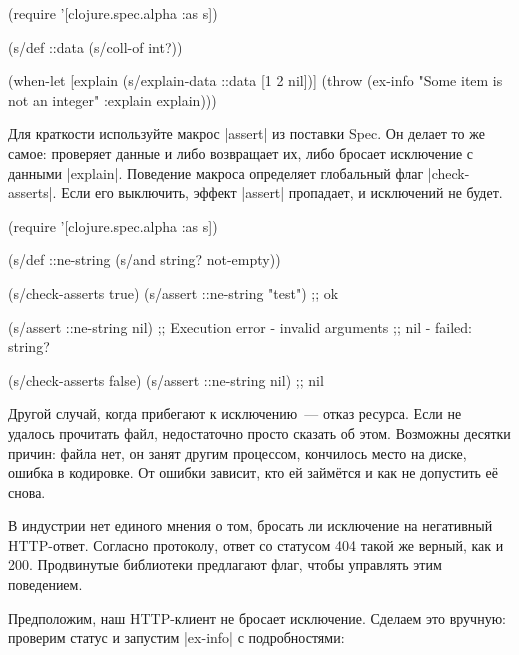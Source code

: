 \begin{english}
  \begin{clojure}
(require '[clojure.spec.alpha :as s])

(s/def ::data (s/coll-of int?))

(when-let [explain (s/explain-data ::data [1 2 nil])]
  (throw (ex-info "Some item is not an integer"
                  {:explain explain})))
  \end{clojure}
\end{english}


Для краткости используйте макрос \spverb|assert| из поставки Spec. Он делает то
же самое: проверяет данные и либо возвращает их, либо бросает исключение с
данными \spverb|explain|. Поведение макроса определяет глобальный флаг
\spverb|check-asserts|. Если его выключить, эффект \spverb|assert| пропадает, и
исключений не будет.

\begin{english}
  \begin{clojure}
(require '[clojure.spec.alpha :as s])

(s/def ::ne-string (s/and string? not-empty))

(s/check-asserts true)
(s/assert ::ne-string "test") ;; ok

(s/assert ::ne-string nil)
;; Execution error - invalid arguments
;; nil - failed: string?

(s/check-asserts false)
(s/assert ::ne-string nil) ;; nil
  \end{clojure}
\end{english}

Другой случай, когда прибегают к исключению~--- отказ ресурса. Если не удалось
прочитать файл, недостаточно просто сказать об этом. Возможны десятки причин:
файла нет, он занят другим процессом, кончилось место на диске, ошибка в
кодировке. От ошибки зависит, кто ей займ\"{е}тся и как не допустить е\"{е}
снова.


В индустрии нет единого мнения о том, бросать ли исключение на негативный
HTTP-ответ. Согласно протоколу, ответ со статусом 404 такой же верный, как и
200. Продвинутые библиотеки предлагают флаг, чтобы управлять этим поведением.

Предположим, наш HTTP-клиент не бросает исключение. Сделаем это вручную:
проверим статус и запустим \spverb|ex-info| с подробностями:


